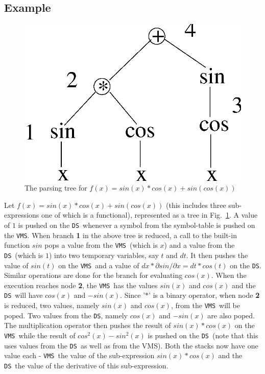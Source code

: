 \documentclass[acmtoms,acmnow]{acmtrans2m}
\newcommand{\DS}{{\tt DS}}
\newcommand{\VMS}{{\tt VMS}}
\begin{document}
\subsection{Example}
\begin{figure}[t]
\begin{center}
  \includegraphics[scale=0.45]{Figs/fig1.ps}
\caption[]{The parsing tree for $f(x)=sin(x)*cos(x) + sin(cos(x))$}
\label{EX1}
\end{center}
\end{figure}


Let $f(x)=sin(x)*cos(x) + sin(cos(x))$ (this includes three
sub-expressions one of which is a functional), represented as a tree
in Fig.~\ref{EX1}.  A value of $1$ is pushed on the \DS\ whenever a
symbol from the symbol-table is pushed on the \VMS.  When branch {\bf
  1} in the above tree is reduced, a call to the built-in function
$sin$ pops a value from the \VMS\ (which is $x$) and a value from the
\DS\ (which is $1$) into two temporary variables, say $t$ and $dt$.
It then pushes the value of $sin(t)$ on the \VMS\ and a value of
$dx*\partial sin / \partial x = dt*cos(t)$ on the \DS.  Similar
operations are done for the branch for evaluating $cos(x)$.  When the
execution reaches node {\bf 2}, the \VMS\ has the values $sin(x)$ and
$cos(x)$ and the \DS\ will have $cos(x)$ and $-sin(x)$.  Since '$*$'
is a binary operator, when node {\bf 2} is reduced, two values, namely
$sin(x)$ and $cos(x)$, from the \VMS\ will be poped.  Two values from
the \DS, namely $cos(x)$ and $-sin(x)$ are also poped.  The
multiplication operator then pushes the result of $sin(x)*cos(x)$ on
the \VMS\ while the result of $cos^2(x)-sin^2(x)$ is pushed on the
\DS\ (note that this uses values from the \DS\ as well as from the
VMS).  Both the stacks now have one value each - \VMS\ the value of
the sub-expression $sin(x)*cos(x)$ and the \DS\ the value of the
derivative of this sub-expression.
\end{document}
